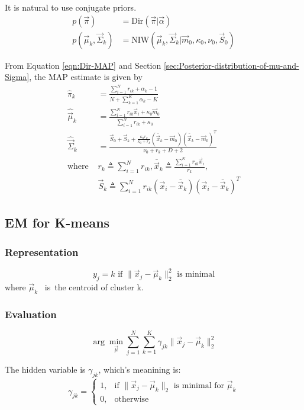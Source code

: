 It is natural to use conjugate priors. 
\begin{align*}
p(\vec{\pi}) & = \mathrm{Dir}(\vec{\pi}|\vec{\alpha}) \\
p(\vec{\mu}_k,\vec{\Sigma}_k) & = \mathrm{NIW}(\vec{\mu}_k,\vec{\Sigma}_k|\vec{m}_0,\kappa_0,\nu_0,\vec{S}_0)
\end{align*}

From Equation \eqref{eqn:Dir-MAP} and Section \ref{sec:Posterior-distribution-of-mu-and-Sigma}, the MAP estimate is given by
\begin{align}
\hat{\pi}_k & = \frac{\sum_{i=1}^N r_{ik}+\alpha_k-1}{N+\sum_{k=1}^K \alpha_k-K} \\
\hat{\vec{\mu}}_k & = \frac{\sum_{i=1}^N r_{ik}\vec{x}_i + \kappa_0\vec{m}_0}{\sum_{i=1}^N r_{ik} + \kappa_0} \\
\hat{\vec{\Sigma}}_k & = \frac{\vec{S}_0+\vec{S}_k+\frac{\kappa_0r_k}{\kappa_0+r_k}(\bar{\vec{x}}_k-\vec{m}_0)(\bar{\vec{x}}_k-\vec{m}_0)^T}{\nu_0+r_k+D+2} \\
\text{where } & r_k \triangleq \sum_{i=1}^N r_{ik}, \bar{\vec{x}}_k \triangleq \frac{\sum_{i=1}^N r_{ik}\vec{x}_i}{r_k}, \nonumber \\
  & \vec{S}_k \triangleq \sum_{i=1}^N r_{ik} (\vec{x}_i-\bar{\vec{x}}_k)(\vec{x}_i-\bar{\vec{x}}_k)^T \nonumber
\end{align}


\subsection{EM for K-means}
\label{sec:K-means}

\subsubsection{Representation}
\begin{equation}
y_j=k \text{ if } \|\vec{x}_j-\vec{\mu}_k\|_2^2 \text{ is minimal}
\end{equation}
where $\vec{\mu}_k$ \ is\ the centroid of cluster k.


\subsubsection{Evaluation}
\begin{equation}
\arg\min\limits_{\vec{\mu}} \sum_{j=1}^N {\sum_{k=1}^K}\gamma_{jk}{\|\vec{x}_j-\vec{\mu}_k\|_2^2}
\end{equation}

The hidden variable is $\gamma_{jk}$, which's meanining is:
\begin{equation} \nonumber
\gamma_{jk}=\begin{cases}
1, & \text{if } \|\vec{x}_j-\vec{\mu}_k\|_2 \text{ is minimal for } \vec{\mu}_k \\
0, & \text{otherwise}
\end{cases}
\end{equation}


